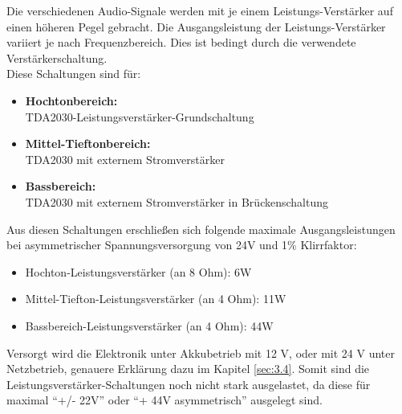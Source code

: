 Die verschiedenen Audio-Signale werden mit je einem Leistungs-Verstärker auf einen höheren Pegel gebracht.
Die Ausgangsleistung der Leistungs-Verstärker variiert je nach Frequenzbereich.
Dies ist bedingt durch die verwendete Verstärkerschaltung.\\
Diese Schaltungen sind für:
\begin{itemize}
	\item \textbf{Hochtonbereich:}\\ TDA2030-Leistungsverstärker-Grundschaltung
	\item \textbf{Mittel-Tieftonbereich:}\\ TDA2030 mit externem Stromverstärker
	\item \textbf{Bassbereich:}\\ TDA2030 mit externem Stromverstärker in Brückenschaltung
\end{itemize}
Aus diesen Schaltungen erschließen sich folgende maximale Ausgangsleistungen bei asymmetrischer Spannungsversorgung von 24V und 1\% Klirrfaktor:\\
\begin{itemize}
	\item Hochton-Leistungsverstärker (an 8 Ohm): 6W
	\item Mittel-Tiefton-Leistungsverstärker (an 4 Ohm): 11W
	\item Bassbereich-Leistungsverstärker (an 4 Ohm): 44W
\end{itemize}

Versorgt wird die Elektronik unter Akkubetrieb mit 12 V, oder mit 24 V unter Netzbetrieb, genauere Erklärung dazu im Kapitel \ref{sec:3.4}.
Somit sind die Leistungsverstärker-Schaltungen noch nicht stark ausgelastet, da diese für maximal \enquote{+/- 22V} oder \enquote{+ 44V asymmetrisch} ausgelegt sind.


\newpage

